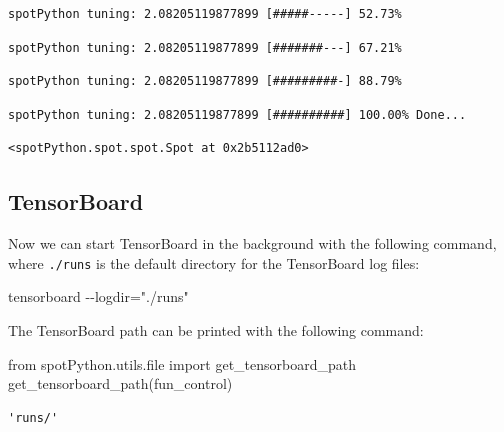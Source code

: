 \documentclass[
  letterpaper,
  DIV=11,
  numbers=noendperiod]{scrreprt}
\newenvironment{Shaded}{\begin{snugshade}}{\end{snugshade}}
\newcommand{\BuiltInTok}[1]{\textcolor[rgb]{0.00,0.23,0.31}{#1}}
\newcommand{\ImportTok}[1]{\textcolor[rgb]{0.00,0.46,0.62}{#1}}
\newcommand{\NormalTok}[1]{\textcolor[rgb]{0.00,0.23,0.31}{#1}}
\begin{document}
\begin{verbatim}
spotPython tuning: 2.08205119877899 [#####-----] 52.73% 
\end{verbatim}

\begin{verbatim}
spotPython tuning: 2.08205119877899 [#######---] 67.21% 
\end{verbatim}

\begin{verbatim}
spotPython tuning: 2.08205119877899 [#########-] 88.79% 
\end{verbatim}

\begin{verbatim}
spotPython tuning: 2.08205119877899 [##########] 100.00% Done...
\end{verbatim}

\begin{verbatim}
<spotPython.spot.spot.Spot at 0x2b5112ad0>
\end{verbatim}

\hypertarget{sec-tensorboard-10}{%
\subsection{TensorBoard}\label{sec-tensorboard-10}}

Now we can start TensorBoard in the background with the following
command, where \texttt{./runs} is the default directory for the
TensorBoard log files:

\begin{Shaded}
\begin{Highlighting}[]
\NormalTok{tensorboard {-}{-}logdir="./runs"}
\end{Highlighting}
\end{Shaded}

\begin{tcolorbox}[enhanced jigsaw, rightrule=.15mm, opacityback=0, colframe=quarto-callout-tip-color-frame, opacitybacktitle=0.6, toptitle=1mm, arc=.35mm, colbacktitle=quarto-callout-tip-color!10!white, coltitle=black, toprule=.15mm, leftrule=.75mm, titlerule=0mm, title=\textcolor{quarto-callout-tip-color}{\faLightbulb}\hspace{0.5em}{Tip: TENSORBOARD\_PATH}, bottomrule=.15mm, breakable, bottomtitle=1mm, left=2mm, colback=white]

The TensorBoard path can be printed with the following command:

\begin{Shaded}
\begin{Highlighting}[]
\ImportTok{from}\NormalTok{ spotPython.utils.}\BuiltInTok{file} \ImportTok{import}\NormalTok{ get\_tensorboard\_path}
\NormalTok{get\_tensorboard\_path(fun\_control)}
\end{Highlighting}
\end{Shaded}

\begin{verbatim}
'runs/'
\end{verbatim}

\end{tcolorbox}
\end{document}
